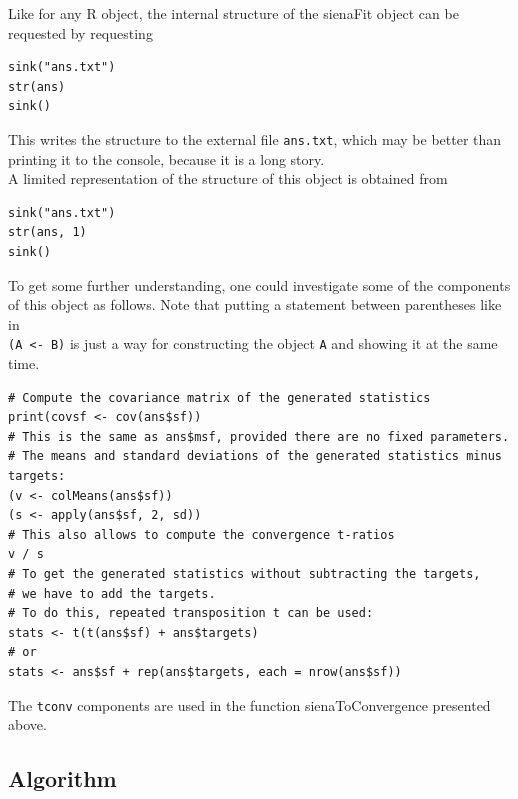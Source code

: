 \documentclass[a4paper,fleqn,11pt]{article}
\newcommand{\+}{\, + \,}
\newcommand{\R}{{\sf R }}
\begin{document}
Like for any \R object, the internal structure of the \textsf{sienaFit} object
can be requested by requesting
\begin{verbatim}
sink("ans.txt")
str(ans)
sink()
\end{verbatim}
This writes the structure to the external file \texttt{ans.txt}, which may
be better than printing it to the console, because it is a long story.\\
A limited representation of the structure of this object is obtained from
\begin{verbatim}
sink("ans.txt")
str(ans, 1)
sink()
\end{verbatim}

To get some further understanding, one could investigate some of the components
of this object as follows.
Note that putting a statement between parentheses like in\\
\texttt{(A <- B)} is just a way for
constructing the object \texttt{A} and showing it at the same time.
\begin{verbatim}
# Compute the covariance matrix of the generated statistics
print(covsf <- cov(ans$sf))
# This is the same as ans$msf, provided there are no fixed parameters.
# The means and standard deviations of the generated statistics minus targets:
(v <- colMeans(ans$sf))
(s <- apply(ans$sf, 2, sd))
# This also allows to compute the convergence t-ratios
v / s
# To get the generated statistics without subtracting the targets,
# we have to add the targets.
# To do this, repeated transposition t can be used:
stats <- t(t(ans$sf) + ans$targets)
# or
stats <- ans$sf + rep(ans$targets, each = nrow(ans$sf))
\end{verbatim}

The \texttt{tconv} components are used
in the function \textsf{sienaToConvergence}
presented above.

\subsection{Algorithm}
\label{S_algorithm}
\end{document}

